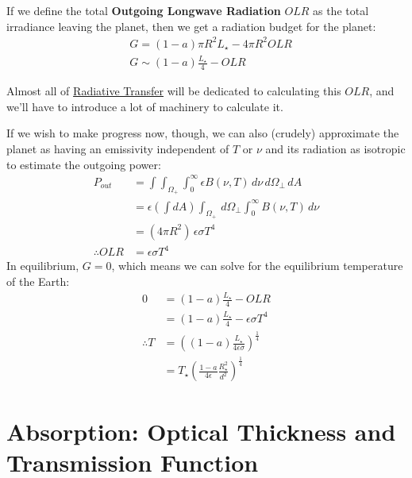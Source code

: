 If we define the total \textbf{Outgoing Longwave Radiation} $OLR$ as the total irradiance leaving the planet, then we get a radiation budget for the planet:
\begin{align}
   & G  = (1-a)\pi R^2 L_\star - 4\pi R^2 OLR \nonumber\\
   & \boxed{G \sim (1-a) \frac{L_\star}{4} - OLR}
\end{align}

Almost all of \hyperref[Radiative Transfer]{Radiative Transfer} will be dedicated to calculating this $OLR$, and we'll have to introduce a lot of machinery to calculate it.

If we wish to make progress now, though, we can also (crudely) approximate the planet as having an emissivity independent of $T$ or $\nu$ and its radiation as isotropic to estimate the outgoing power:
\begin{align*}
    P_{out}&=\int\int_{\Omega_+}\int _0^\infty \epsilon B(\nu,T)\,d\nu\,d\Omega_\perp\,dA\\
    &=\epsilon\left(\int dA\right)\int_{\Omega_+}\,d\Omega_\perp\int _0^\infty B(\nu,T)\,d\nu\\
    &=(4\pi R^2)\,\epsilon\sigma T^4\\
    \therefore OLR &= \epsilon\sigma T^4
\end{align*}
In equilibrium, $G=0$, which means we can solve for the equilibrium temperature of the Earth:
\begin{align*}
    0&=(1-a) \frac{L_\star}{4} - OLR\\
    &=(1-a) \frac{L_\star}{4} - \epsilon\sigma T^4\\
    \therefore T &= \left( 
        (1-a) \frac{L_\star}{4\epsilon\sigma}
     \right)^{\frac{1}{4}}\\
    &=T_{\star}\left(
    \frac{1-a}{4\epsilon}\frac{R_{\star}^2}{d^2}
    \right)^\frac{1}{4}
\end{align*}


\section{Absorption: Optical Thickness and Transmission Function}

